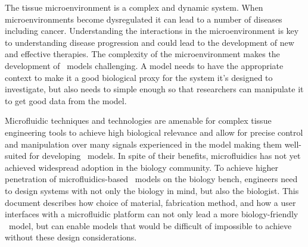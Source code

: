 The tissue microenvironment is a complex and dynamic system.
When microenvironments become dysregulated it can lead to a number of
diseases including cancer. Understanding the interactions in the microenvironment
is key to understanding disease progression and could lead to the development of
new and effective therapies. The complexity of the microenvironment makes the
development of \invitro\ models challenging. A model needs to have the appropriate
context to make it a good biological proxy for the system it’s designed to investigate,
but also needs to simple enough so that researchers can manipulate it to get good
data from the model.

Microfluidic techniques and technologies are amenable for complex tissue engineering tools to achieve high biological relevance and allow for precise control and manipulation over many signals experienced in the model making them well-suited for developing \invitro\ models. In spite of their benefits, microfluidics has not yet achieved widespread adoption in the biology community. To achieve higher penetration of microfluidics-based \invitro\ models on the biology bench, engineers need to design systems with not only the biology in mind, but also the biologist. This document describes how choice of material, fabrication method, and how a user interfaces with a microfluidic platform can not only lead a more biology-friendly \invitro\ model, but can enable models that would be difficult of impossible to achieve without these design considerations.